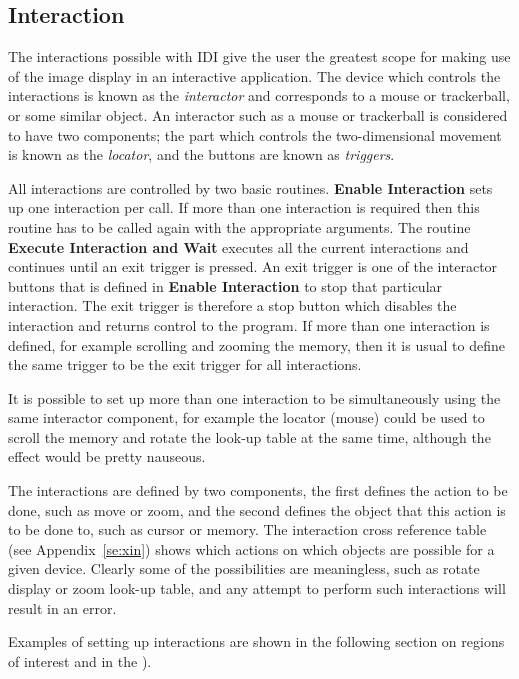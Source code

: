 \documentclass[11pt,nolof]{starlink}
\begin{document}
\subsection{Interaction}

The interactions possible with IDI give the user the greatest scope for
making use of the image display in an interactive application. The
device which controls the interactions is known as the \textit{interactor}
and corresponds to a mouse or trackerball, or some similar object.
An interactor such as a mouse or trackerball is considered to have two
components; the part which controls the two-dimensional movement is
known as the \textit{locator}, and the buttons are known as \textit{triggers}.

All interactions are controlled by two basic routines. \textbf{Enable
Interaction} sets up one interaction per call. If more than one
interaction is required then this routine has to be called again with
the appropriate arguments. The routine \textbf{Execute Interaction and
Wait} executes all the current interactions and continues until an exit
trigger is pressed. An exit trigger is one of the interactor buttons that
is defined in \textbf{Enable Interaction} to stop that particular interaction.
The exit trigger is therefore a stop button which disables the interaction
and returns control to the program.
If more than one interaction is defined, for example scrolling and zooming
the memory, then it is usual to define the same trigger to be the exit
trigger for all interactions.

It is possible to set up more than one interaction to be simultaneously
using the same interactor component, for example the locator (mouse)
could be used to scroll the memory and rotate the look-up table at the
same time, although the effect would be pretty nauseous.

The interactions are defined by two components, the first defines the
action to be done, such as move or zoom, and the second defines the object
that this action is to be done to, such as cursor or memory.
The interaction cross reference table
(see Appendix~\ref{se:xin})
shows which actions on which objects are possible for a given
device. Clearly some of the possibilities are meaningless, such as rotate
display or zoom look-up table, and any attempt to perform such interactions
will result in an error.

Examples of setting up interactions are shown in the following section on
regions of interest and in the
).
\end{document}
